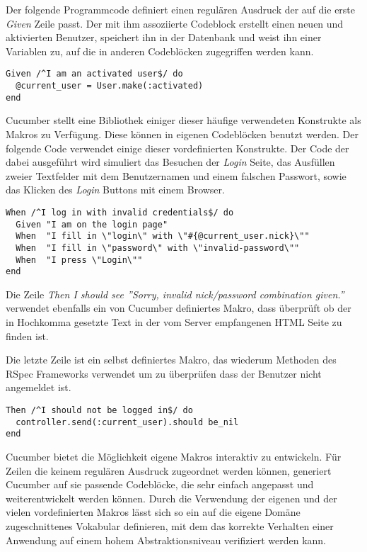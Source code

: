Der folgende Programmcode definiert einen regulären Ausdruck der auf
die erste \textit{Given} Zeile passt. Der mit ihm assoziierte Codeblock
erstellt einen neuen und aktivierten Benutzer, speichert ihn in der
Datenbank und weist ihn einer Variablen zu, auf die in anderen
Codeblöcken zugegriffen werden kann.

\begin{lstlisting}
Given /^I am an activated user$/ do
  @current_user = User.make(:activated)
end
\end{lstlisting}

Cucumber stellt eine Bibliothek einiger dieser häufige verwendeten
Konstrukte als Makros zu Verfügung. Diese können in eigenen
Codeblöcken benutzt werden. Der folgende Code verwendet einige dieser
vordefinierten Konstrukte. Der Code der dabei ausgeführt wird
simuliert das Besuchen der \textit{Login} Seite, das Ausfüllen zweier
Textfelder mit dem Benutzernamen und einem falschen Passwort, sowie
das Klicken des \textit{Login} Buttons mit einem Browser.

\begin{lstlisting}
When /^I log in with invalid credentials$/ do
  Given "I am on the login page"
  When  "I fill in \"login\" with \"#{@current_user.nick}\""
  When  "I fill in \"password\" with \"invalid-password\""
  When  "I press \"Login\""
end
\end{lstlisting}

Die Zeile \textit{Then I should see ''Sorry, invalid nick/password
  combination given.''} verwendet ebenfalls ein von Cucumber
definiertes Makro, dass überprüft ob der in Hochkomma gesetzte Text in
der vom Server empfangenen HTML Seite zu finden ist.

Die letzte Zeile ist ein selbst definiertes Makro, das wiederum
Methoden des RSpec Frameworks verwendet um zu überprüfen dass der
Benutzer nicht angemeldet ist.

\begin{lstlisting}
Then /^I should not be logged in$/ do
  controller.send(:current_user).should be_nil
end
\end{lstlisting}

Cucumber bietet die Möglichkeit eigene Makros interaktiv zu
entwickeln. Für Zeilen die keinem regulären Ausdruck zugeordnet werden
können, generiert Cucumber auf sie passende Codeblöcke, die sehr
einfach angepasst und weiterentwickelt werden können. Durch die
Verwendung der eigenen und der vielen vordefinierten Makros lässt sich
so ein auf die eigene Domäne zugeschnittenes Vokabular definieren, mit
dem das korrekte Verhalten einer Anwendung auf einem hohem
Abstraktionsniveau verifiziert werden kann.

